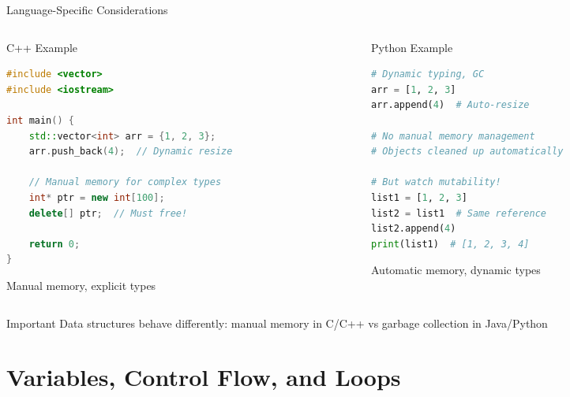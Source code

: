 \documentclass[aspectratio=169,xcolor=dvipsnames]{beamer}
\begin{document}
\begin{frame}[fragile]{Language-Specific Considerations}
  \begin{columns}
    \begin{column}{0.48\textwidth}
      \begin{exampleblock}{C++ Example}
        \begin{lstlisting}[language=C++,basicstyle=\tiny\ttfamily]
#include <vector>
#include <iostream>

int main() {
    std::vector<int> arr = {1, 2, 3};
    arr.push_back(4);  // Dynamic resize

    // Manual memory for complex types
    int* ptr = new int[100];
    delete[] ptr;  // Must free!

    return 0;
}
        \end{lstlisting}
        Manual memory, explicit types
      \end{exampleblock}
    \end{column}
    \begin{column}{0.48\textwidth}
      \begin{exampleblock}{Python Example}
        \begin{lstlisting}[language=Python,basicstyle=\tiny\ttfamily]
# Dynamic typing, GC
arr = [1, 2, 3]
arr.append(4)  # Auto-resize

# No manual memory management
# Objects cleaned up automatically

# But watch mutability!
list1 = [1, 2, 3]
list2 = list1  # Same reference
list2.append(4)
print(list1)  # [1, 2, 3, 4]
        \end{lstlisting}
        Automatic memory, dynamic types
      \end{exampleblock}
    \end{column}
  \end{columns}

  \vspace{0.3cm}

  \begin{alertblock}{Important}
    Data structures behave differently: manual memory in C/C++ vs garbage collection in Java/Python
  \end{alertblock}
\end{frame}

\section{Variables, Control Flow, and Loops}
\end{document}

